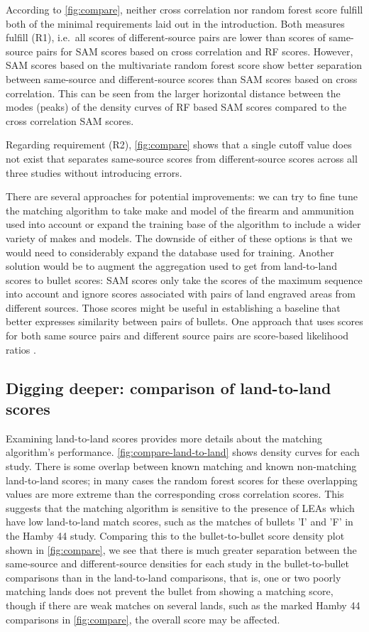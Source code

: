 \documentclass[doubleblind]{elsarticle}\usepackage[]{graphicx}\usepackage[]{color}
\begin{document}
According to \autoref{fig:compare}, neither cross correlation nor random forest score fulfill both of the minimal requirements laid out in the introduction. Both measures fulfill (R1), i.e.\ all  scores  of  different-source pairs are lower than scores of same-source pairs for SAM scores based on cross correlation and RF scores.
However, SAM scores based on the multivariate random forest score show better separation between same-source and different-source scores than SAM scores based on cross correlation. This can be seen from the larger horizontal distance between the modes (peaks) of the density curves of RF based SAM scores compared to the cross correlation SAM scores.  

Regarding requirement (R2), \autoref{fig:compare} shows that a single cutoff value does not exist that separates same-source scores from different-source scores across all three studies without introducing errors.

There are several approaches for potential improvements: we can try to fine tune the matching algorithm to take make and model of the firearm and ammunition used into account or expand the training base of the algorithm to include a wider variety of makes and models. The downside of either of these options is that we would need to considerably expand the database used for training. Another solution would be to augment the aggregation used to get from land-to-land scores to bullet scores: SAM scores only take the scores of the maximum sequence into account and ignore scores associated with pairs of land engraved areas from different sources. Those scores might be useful in establishing a baseline that better expresses similarity between pairs of bullets. One approach that uses scores for both same source pairs and different source pairs are score-based likelihood ratios \citep{Bunch:2013if, Morrison:2018fh}.

\subsection{Digging deeper: comparison of land-to-land scores}

Examining land-to-land scores provides more details about the matching algorithm's performance. \autoref{fig:compare-land-to-land} shows density curves for each study. There is some overlap between known matching and known non-matching land-to-land scores; in many cases the random forest scores for these overlapping values are more extreme than the corresponding cross correlation scores. This suggests that the matching algorithm is sensitive to the presence of LEAs which have low land-to-land match scores, such as the matches of bullets 'I' and 'F' in the Hamby 44 study. Comparing this to the bullet-to-bullet score density plot shown in \autoref{fig:compare}, we see that there is much greater separation between the same-source and different-source densities for each study in the bullet-to-bullet comparisons than in the land-to-land comparisons, that is, one or two poorly matching lands does not prevent the bullet from showing a matching score, though if there are weak matches on several lands, such as the marked Hamby 44 comparisons in \autoref{fig:compare}, the overall score may be affected. 
\end{document}
